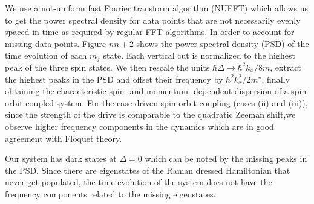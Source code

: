 We use a not-uniform fast Fourier transform algorithm (NUFFT) which allows us to get the power spectral density for data points that are not necessarily evenly spaced in time as required by regular FFT algorithms. In order to account for missing data points. Figure $nn+2$ shows the power spectral density (PSD) of the time evolution of each $m_f$ state. Each vertical cut is normalized to the highest peak of the three spin states. We then rescale the units $\hbar\Delta\rightarrow	 \hbar^2k_x/8m$, extract the highest peaks in the PSD and offset their frequency by $\hbar^2k_x^2/2m^{\star}$, finally obtaining the characteristic spin- and momentum- dependent dispersion of a spin orbit coupled system. For the case driven spin-orbit coupling (cases (ii) and (iii)), since the strength of the drive is comparable to the quadratic Zeeman shift,we observe higher frequency components in the dynamics which are in good agreement with Floquet theory.

Our system has dark states at $\Delta=0$ which can be noted by the missing peaks in the PSD. Since there are eigenstates of the Raman dressed Hamiltonian that never get populated, the time evolution of the system does not have the frequency components related to the missing eigenstates. 
